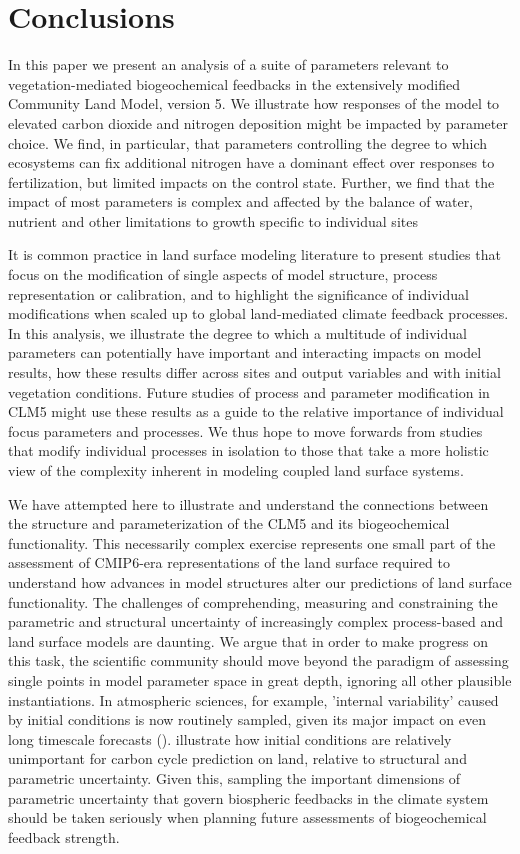 \documentclass[draft,linenumbers]{agujournal}
\begin{document}
\section{Conclusions}
In this paper we present an analysis of a suite of parameters relevant to vegetation-mediated biogeochemical feedbacks in the extensively modified Community Land Model, version 5. We illustrate how responses of the model to elevated carbon dioxide and nitrogen deposition might be impacted by parameter choice. We find, in particular, that parameters controlling the degree to which ecosystems can fix additional nitrogen have a dominant effect over responses to fertilization, but limited impacts on the control state. Further, we find that the impact of most parameters is complex and affected by the balance of water, nutrient and other limitations to growth specific to individual sites

It is common practice in land surface modeling literature to present studies that focus on the modification of single aspects of model structure, process representation or calibration, and to highlight the significance of individual modifications when scaled up to global land-mediated climate feedback processes. In this analysis, we illustrate the degree to which a multitude of individual parameters can potentially have important and interacting impacts on model results, how these results differ across sites and output variables and with initial vegetation conditions.  Future studies of process and parameter modification in CLM5 might use these results as a guide to the relative importance of individual focus parameters and processes. We thus hope to move forwards from studies that modify individual processes in isolation to those that take a more holistic view of the complexity inherent in modeling coupled land surface systems.

We have attempted here to illustrate and understand the connections between the structure and parameterization of the CLM5 and its biogeochemical functionality. This necessarily complex exercise represents one small part of the assessment of CMIP6-era representations of the land surface required to understand how advances in model structures alter our predictions of land surface functionality.  The challenges of comprehending, measuring and constraining the parametric and structural uncertainty of increasingly complex process-based and land surface models are daunting. We argue that in order to make progress on this task, the scientific community should move beyond the paradigm of assessing single points in model parameter space in great depth, ignoring all other plausible instantiations. In atmospheric sciences, for example, 'internal variability' caused by initial conditions is now routinely sampled, given its major impact on even long timescale forecasts (\cite{kay2015}). \cite{bonan2018} illustrate how initial conditions are relatively unimportant for carbon cycle prediction on land, relative to structural and parametric uncertainty. Given this, sampling the important dimensions of parametric uncertainty that govern biospheric feedbacks in the climate system should be taken seriously when planning future assessments of biogeochemical feedback strength.
\end{document}
